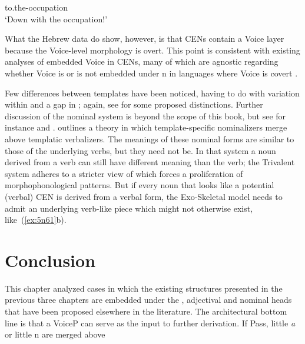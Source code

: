 \begin{exe}
\begin{xlist}
\begin{exe}
\begin{xlist}
\begin{exe}
\begin{exe}
\begin{xlist}
\begin{exe}
\begin{exe}
\begin{xlist}
\begin{exe}
\begin{xlist}
\begin{exe}
\begin{xlist}
\begin{exe}
\begin{xlist}
\begin{exe}
\begin{xlist}
\begin{xlist}
\begin{exe}
\begin{xlist}
\begin{exe}
\begin{xlist}
\begin{exe}
\begin{exe}
\begin{exe}
\begin{xlist}
\begin{exe}
\begin{exe}
\begin{xlist}
\begin{exe}
\begin{xlist}
\begin{exe}
\begin{xlist}
\begin{exe}
\begin{xlist}
\begin{xlist}
\begin{exe}
\begin{xlist}
\begin{exe}
\begin{xlist}
\begin{exe}
\begin{xlist}
\begin{exe}
\begin{xlist}
\begin{exe}
\begin{exe}
\begin{exe}
\begin{exe}
\begin{exe}
\begin{xlist}
\begin{xlist}
\begin{exe}
\begin{xlist}
\begin{exe}
\begin{xlist}
\begin{exe}
\begin{exe}
\begin{exe}
\begin{xlist}
\begin{exe}
\begin{xlist}
\begin{exe}
\begin{xlist}
\begin{exe}
\begin{exe}
\begin{xlist}
\begin{exe}
\begin{exe}
\begin{exe}
\begin{xlist}
\begin{xlist}
\begin{exe}
\begin{exe}
\begin{exe}
\begin{xlist}
\begin{exe}
\begin{xlist}
{to.the-occupation\\
 		\glt `Down with the occupation!' } 
		
 \z
\z 

What the Hebrew data do show, however, is that CENs contain a Voice layer because the Voice-level morphology is overt. This point is consistent with existing analyses of embedded Voice in CENs, many of which are agnostic regarding whether Voice is or is not embedded under n in languages where Voice is covert \citep{alexiadou17,wood19lsa}.

Few differences between templates have been noticed, having to do with variation within {\tkal} \citep{borer13oup} and a gap in {\tnif} \citep{silonipreminger09,ahdoutkastner19nels}; again, see \cite{ahdout19glow,ahdout19phd} for some proposed distinctions. Further discussion of the nominal system is beyond the scope of this book, but see for instance \cite{fausthever10} and \cite{laks15ws}. \citet[534fn13, 555]{borer13oup} outlines a theory in which template-specific nominalizers merge above templatic verbalizers. The meanings of these nominal forms are similar to those of the underlying verbs, but they need not be. In that system a noun derived from a verb can still have different meaning than the verb; the Trivalent system adheres to a stricter view of  which forces a proliferation of morphophonological patterns. But if every noun that looks like a potential (verbal) CEN is derived from a verbal form, the Exo-Skeletal model needs to admit an underlying verb-like piece which might not otherwise exist, like~(\ref{ex:5n61}b).


\section{Conclusion} \label{passn:conc}
This chapter analyzed cases in which the existing structures presented in the previous three chapters are embedded under the , adjectival and nominal heads that have been proposed elsewhere in the literature. The architectural bottom line is that a VoiceP can serve as the input to further derivation. If Pass, little \textit{a} or little n are merged above 
\end{xlist}
\end{exe}
\end{xlist}
\end{exe}
\end{exe}
\end{exe}
\end{xlist}
\end{xlist}
\end{exe}
\end{exe}
\end{exe}
\end{xlist}
\end{exe}
\end{exe}
\end{xlist}
\end{exe}
\end{xlist}
\end{exe}
\end{xlist}
\end{exe}
\end{exe}
\end{exe}
\end{xlist}
\end{exe}
\end{xlist}
\end{exe}
\end{xlist}
\end{xlist}
\end{exe}
\end{exe}
\end{exe}
\end{exe}
\end{exe}
\end{xlist}
\end{exe}
\end{xlist}
\end{exe}
\end{xlist}
\end{exe}
\end{xlist}
\end{exe}
\end{xlist}
\end{xlist}
\end{exe}
\end{xlist}
\end{exe}
\end{xlist}
\end{exe}
\end{xlist}
\end{exe}
\end{exe}
\end{xlist}
\end{exe}
\end{exe}
\end{exe}
\end{xlist}
\end{exe}
\end{xlist}
\end{exe}
\end{xlist}
\end{xlist}
\end{exe}
\end{xlist}
\end{exe}
\end{xlist}
\end{exe}
\end{xlist}
\end{exe}
\end{xlist}
\end{exe}
\end{exe}
\end{xlist}
\end{exe}
\end{exe}
\end{xlist}
\end{exe}
\end{xlist}
\end{exe}
